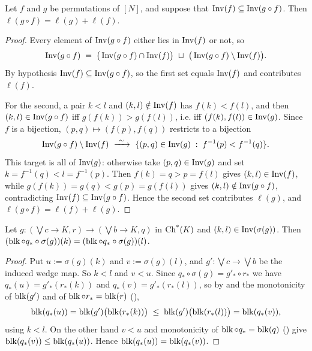 \documentclass[11pt]{article}
\begin{document}
\begin{lemma}\label{lem:no-double-crossing}
  Let $f$ and $g$ be permutations of $[N]$,
  and suppose that $\operatorname{Inv}(f) \subseteq \operatorname{Inv}(g \circ f)$.
  Then $\ell(g \circ f) = \ell(g) + \ell(f)$.
\end{lemma}
\begin{proof}
Every element of $\operatorname{Inv}(g\circ f)$ either lies in $\operatorname{Inv}(f)$ or not, so
\[
  \operatorname{Inv}(g\circ f) \;=\; \big(\operatorname{Inv}(g\circ f)\cap \operatorname{Inv}(f)\big)\ \sqcup\ \big(\operatorname{Inv}(g\circ f)\setminus \operatorname{Inv}(f)\big).
\]
By hypothesis $\operatorname{Inv}(f)\subseteq \operatorname{Inv}(g\circ f)$, so the first set equals $\operatorname{Inv}(f)$ and contributes $\ell(f)$.

For the second, a pair $k < l$ and $(k,l)\notin \operatorname{Inv}(f)$ has $f(k)<f(l)$, and then $(k,l)\in \operatorname{Inv}(g\circ f)$
iff $g(f(k))>g(f(l))$, i.e. iff $(f(k),f(l))\in \operatorname{Inv}(g)$. Since $f$ is a bijection,
$(p,q)\mapsto(f(p),f(q))$ restricts to a bijection
\[
  \operatorname{Inv}(g\circ f)\setminus \operatorname{Inv}(f)\ \xrightarrow{\ \sim\ }\ \{(p,q)\in \operatorname{Inv}(g)\;:\;f^{-1}(p)<f^{-1}(q)\}.
\]
This target is all of $\operatorname{Inv}(g)$: otherwise take $(p,q)\in \operatorname{Inv}(g)$ and set
$k=f^{-1}(q)<l=f^{-1}(p)$. Then $f(k)=q>p=f(l)$ gives $(k,l)\in \operatorname{Inv}(f)$, while
$g(f(k))=g(q)<g(p)=g(f(l))$ gives $(k,l)\notin \operatorname{Inv}(g\circ f)$, contradicting $\operatorname{Inv}(f)\subseteq \operatorname{Inv}(g\circ f)$.
Hence the second set contributes $\ell(g)$, and $\ell(g\circ f)=\ell(f)+\ell(g)$.
\end{proof}

\begin{lemma}\label{lem:inv-restrict}
Let $g : (\bigvee c \to K, r) \to (\bigvee b\to K, q)$ in $\operatorname{Ch^*}(K)$ and $(k,l) \in \operatorname{Inv}(\sigma(g))$. 
Then $(\operatorname{blk} \circ q_* \circ \sigma(g))(k) = (\operatorname{blk} \circ q_* \circ \sigma(g))(l)$.
\end{lemma}
\begin{proof}
Put $u := \sigma(g)(k)$ and $v := \sigma(g)(l)$, and $g' : \bigvee c \to \bigvee b$ be the induced wedge map. 
So $k < l$ and $v < u$. Since $q_* \circ \sigma(g) = g'_* \circ r_*$ we have $q_*(u) = g'_*(r_*(k))$ and $q_*(v) = g'_*(r_*(l))$,
so by  and the monotonicity of $\operatorname{blk}(g')$ and of $\operatorname{blk} \circ r_* = \operatorname{blk}(r)$
(),
\[
  \operatorname{blk}(q_*(u)) = \operatorname{blk}(g')\bigl(\operatorname{blk}(r_*(k))\bigr) \;\le\; \operatorname{blk}(g')\bigl(\operatorname{blk}(r_*(l))\bigr) = \operatorname{blk}(q_*(v)),
\]
using $k < l$. On the other hand $v < u$ and monotonicity of $\operatorname{blk} \circ q_* = \operatorname{blk}(q)$
() give
$\operatorname{blk}(q_*(v)) \le \operatorname{blk}(q_*(u))$. Hence $\operatorname{blk}(q_*(u)) = \operatorname{blk}(q_*(v))$.
\end{proof}
\end{document}
